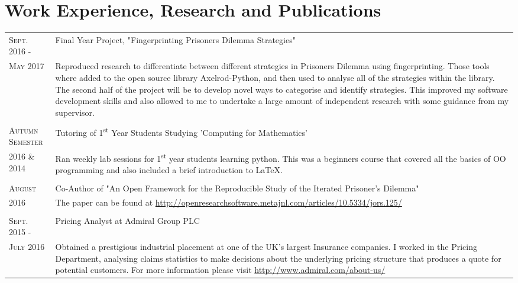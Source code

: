 \documentclass[a4paper]{article}
\begin{document}
\section{Work Experience, Research and Publications}
\begin{tabularx}{\textwidth}{lX}
\textsc{Sept. 2016 - } & Final Year Project, "Fingerprinting Prisoners Dilemma Strategies"\\
\textsc{May 2017} & \footnotesize{Reproduced research to differentiate between different strategies in Prisoners Dilemma using fingerprinting. Those tools where added to the open source library Axelrod-Python, and then used to analyse all of the strategies within the library. The second half of the project will be to develop novel ways to categorise and identify strategies. This improved my software development skills and also allowed to me to undertake a large amount of independent research with some guidance from my supervisor.}
\\
\\
\textsc{Autumn Semester} & Tutoring of 1\textsuperscript{st} Year Students Studying 'Computing for Mathematics'\\
\textsc{2016 \& 2014} & \footnotesize{Ran weekly lab sessions for 1\textsuperscript{st} year students learning python. This was a beginners course that covered all the basics of OO programming and also included a brief introduction to \LaTeX.}
\\
\\
\textsc{August} & Co-Author of "An Open Framework for the Reproducible Study of the Iterated Prisoner’s Dilemma" \\
\textsc{2016} & \footnotesize{The paper can be found at \url{http://openresearchsoftware.metajnl.com/articles/10.5334/jors.125/}}
\\
\\
\textsc{Sept. 2015 -} & Pricing Analyst at Admiral Group PLC \\
\textsc{July 2016} & \footnotesize{Obtained a prestigious industrial placement at one of the UK's largest Insurance companies. I worked in the Pricing Department, analysing claims statistics to make decisions about the underlying pricing structure that produces a quote for potential customers. For more information please visit \url{http://www.admiral.com/about-us/}}
\\

\end{tabularx}
\end{document}
